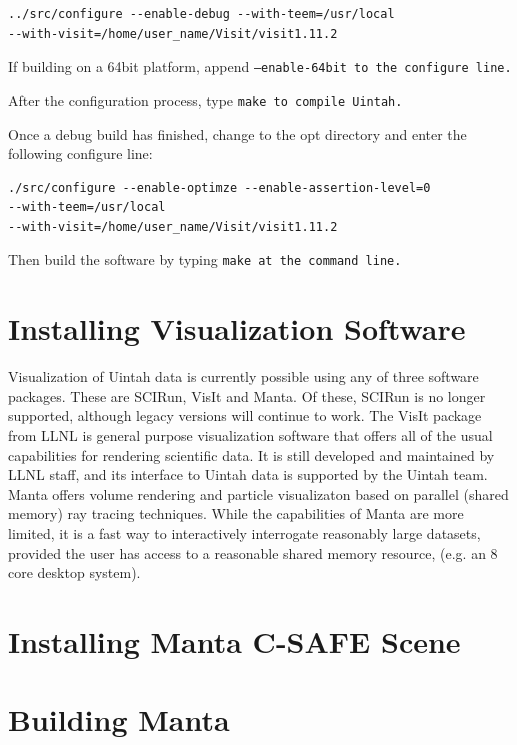 \documentclass[12pt]{article}
\begin{document}
\begin{Verbatim}[fontsize=\footnotesize]
../src/configure --enable-debug --with-teem=/usr/local
--with-visit=/home/user_name/Visit/visit1.11.2
\end{Verbatim}

If building on a 64bit platform, append \tt --enable-64bit \normalfont
to the configure line.

After the configuration process, type \tt make \normalfont to compile
Uintah.

Once a debug build has finished, change to the opt directory and enter
the following configure line:

\begin{Verbatim}[fontsize=\footnotesize]
./src/configure --enable-optimze --enable-assertion-level=0 
--with-teem=/usr/local
--with-visit=/home/user_name/Visit/visit1.11.2
\end{Verbatim}

Then build the software by typing \tt make \normalfont at the command line.

\section{Installing Visualization Software}

Visualization of Uintah data is currently possible using any of three
software packages.  These are SCIRun, VisIt and Manta.  Of these, SCIRun is
no longer supported, although legacy versions will continue to work.  The
VisIt package from LLNL is general purpose visualization software that offers
all of the usual capabilities for rendering scientific data.  It is still
developed and maintained by LLNL staff, and its interface to Uintah data is
supported by the Uintah team.  Manta offers volume rendering and particle
visualizaton based on parallel (shared memory) ray tracing techniques.
While the capabilities of Manta are more limited, it is a fast way to
interactively interrogate reasonably large datasets, provided the user has
access to a reasonable shared memory resource, (e.g. an 8 core desktop system).

\section{Installing Manta C-SAFE Scene}

\section{Building Manta}
\end{document}
